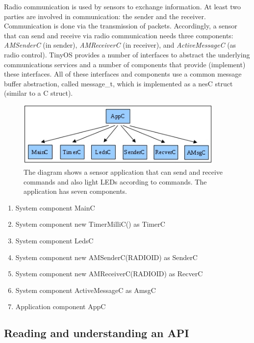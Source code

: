 \documentclass[letterpaper,12pt]{article}
\begin{document}
    Radio communication is used by sensors to exchange information. At least two parties are
    involved in communication: the sender and the receiver. Communication is done via
    the transmission of packets. Accordingly, a sensor that can send and receive via radio
    communication needs three components: \emph{AMSenderC} (in sender), \emph{AMReceiverC} (in receiver),
    and \emph{ActiveMessageC} (as radio control). TinyOS provides a number of interfaces
    to abstract the underlying communications services and a number of components that
    provide (implement) these interfaces. All of these interfaces and components use a
    common message buffer abstraction, called message\_t, which is implemented as a nesC
    struct (similar to a C struct).
    \begin{figure}[ht!]
        \centering
        \includegraphics[width=4in]{tinyos-diagram.jpg}
       \caption*{The diagram shows a sensor application that can send and receive commands and also light LEDs according to commands. The application has seven components.}
    \end{figure}
    \begin{enumerate}
        \item System component MainC
        \item System component new TimerMilliC() as TimerC
        \item System component LedsC
        \item System component new AMSenderC(RADIOID) as SenderC
        \item System component new AMReceiverC(RADIOID) as RecverC
        \item System component ActiveMessageC as AmsgC
        \item Application component AppC
    \end{enumerate}
\subsection*{Reading and understanding an API}
\end{document}
